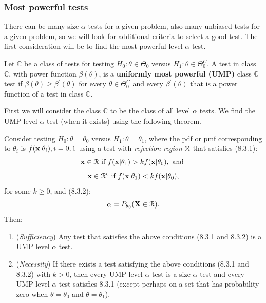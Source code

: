 \documentclass[11pt,]{article}
\providecommand{\tightlist}{%
  \setlength{\itemsep}{0pt}\setlength{\parskip}{0pt}}
\def\bx{{\bf x}}
\def\bX{{\bf X}}
\def\Rsc{{\cal R}}
\def\Cbb{\mathbb{C}}
\begin{document}
\hypertarget{most-powerful-tests}{%
\subsubsection{Most powerful tests}\label{most-powerful-tests}}

There can be many size \(\alpha\) tests for a given problem, also many
unbiased tests for a given problem, so we will look for additional
criteria to select a good test. The first consideration will be to find
the most powerful level \(\alpha\) test.

 Let \(\Cbb\) be a class of tests for
testing \(H_0: \theta \in \Theta_0\) versus
\(H_1: \theta \in \Theta_0^C\). A test in class \(\Cbb\), with power
function \(\beta(\theta)\), is a \textbf{uniformly most powerful (UMP)}
class \(\Cbb\) test if \(\beta(\theta)\geq \beta^\prime(\theta)\) for
every \(\theta \in \Theta_0^C\) and every \(\beta^\prime(\theta)\) that
is a power function of a test in class \(\Cbb\).

First we will consider the class \(\Cbb\) to be the class of all level
\(\alpha\) tests. We find the UMP level \(\alpha\) test (when it exists)
using the following theorem.

 Consider testing
\(H_0: \theta = \theta_0\) versus \(H_1 : \theta = \theta_1\), where the
pdf or pmf corresponding to \(\theta_i\) is
\(f(\bx | \theta_i), i = 0,1\) using a test with \emph{rejection region}
\(\Rsc\) that satisfies (8.3.1):
\[\bx \in \Rsc \mbox{ if } f(\bx|\theta_1) > k f(\bx | \theta_0), \mbox{ and }\]
\[\bx \in \Rsc^c \mbox{ if } f(\bx|\theta_1) < k f(\bx | \theta_0),\]
for some \(k\geq 0\), and (8.3.2):
\[ \alpha = P_{\theta_0} (\bX \in \Rsc).\] Then:

\begin{enumerate}
\def\labelenumi{\alph{enumi})}
\tightlist
\item
  (\emph{Sufficiency}) Any test that satisfies the above conditions
  (8.3.1 and 8.3.2) is a UMP level \(\alpha\) test.
\item
  (\emph{Necessity}) If there exists a test satisfying the above
  conditions (8.3.1 and 8.3.2) with \(k>0\), then every UMP level
  \(\alpha\) test is a size \(\alpha\) test and every UMP level
  \(\alpha\) test satisfies 8.3.1 (except perhaps on a set that has
  probability zero when \(\theta = \theta_0\) and
  \(\theta = \theta_1\)).
\end{enumerate}
\end{document}
